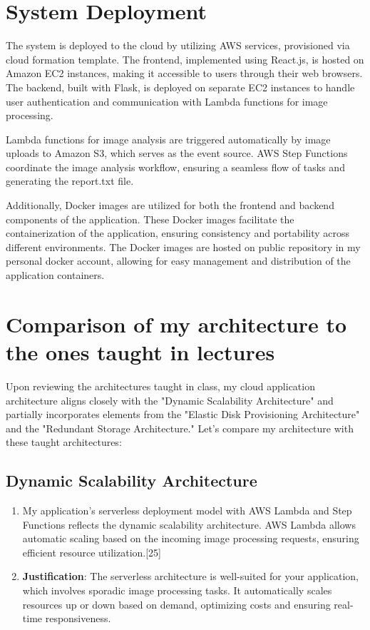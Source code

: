 \section{System Deployment}
The system is deployed to the cloud by utilizing AWS services, provisioned via cloud formation template. The frontend, implemented using React.js, is hosted on Amazon EC2 instances, making it accessible to users through their web browsers. The backend, built with Flask, is deployed on separate EC2 instances to handle user authentication and communication with Lambda functions for image processing.

Lambda functions for image analysis are triggered automatically by image uploads to Amazon S3, which serves as the event source. AWS Step Functions coordinate the image analysis workflow, ensuring a seamless flow of tasks and generating the report.txt file.

Additionally, Docker images are utilized for both the frontend and backend components of the application. These Docker images facilitate the containerization of the application, ensuring consistency and portability across different environments. The Docker images are hosted on public repository in my personal docker account, allowing for easy management and distribution of the application containers.

\section{Comparison of my architecture to the ones taught in lectures}
Upon reviewing the architectures taught in class, my cloud application architecture aligns closely with the "Dynamic Scalability Architecture" and partially incorporates elements from the "Elastic Disk Provisioning Architecture" and the "Redundant Storage Architecture." Let's compare my architecture with these taught architectures:

\subsection{Dynamic Scalability Architecture}
\begin{enumerate}
    \item My application's serverless deployment model with AWS Lambda and Step Functions reflects the dynamic scalability architecture. AWS Lambda allows automatic scaling based on the incoming image processing requests, ensuring efficient resource utilization.[25]
    
    \item \textbf{Justification}: The serverless architecture is well-suited for your application, which involves sporadic image processing tasks. It automatically scales resources up or down based on demand, optimizing costs and ensuring real-time responsiveness.
\end{enumerate}

